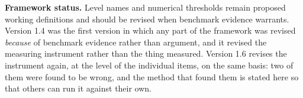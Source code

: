 \documentclass[11pt]{article}
\theoremstyle{definition}
\begin{document}
\vspace{1em}
\noindent\textbf{Framework status.} Level names and numerical thresholds remain proposed working definitions and should be revised when benchmark evidence warrants. Version 1.4 was the first version in which any part of the framework was revised \emph{because} of benchmark evidence rather than argument, and it revised the measuring instrument rather than the thing measured. Version 1.6 revises the instrument again, at the level of the individual items, on the same basis: two of them were found to be wrong, and the method that found them is stated here so that others can run it against their own.
\end{document}
